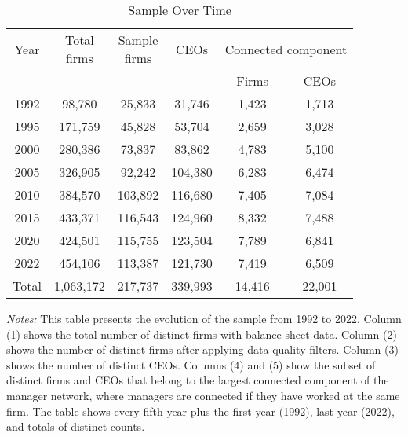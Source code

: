 \begin{table}[htbp]
\centering
\caption{Sample Over Time}
\label{tab:sample}
\begin{tabular}{*{6}{c}}
\toprule
Year & \shortstack{Total\\firms} & \shortstack{Sample\\firms} & CEOs & \multicolumn{2}{c}{Connected component} \\
\cmidrule(lr){5-6}
 & & & & Firms & CEOs \\
\midrule
1992 &       98,780 &       25,833 &       31,746 &        1,423 &        1,713 \\
1995 &      171,759 &       45,828 &       53,704 &        2,659 &        3,028 \\
2000 &      280,386 &       73,837 &       83,862 &        4,783 &        5,100 \\
2005 &      326,905 &       92,242 &      104,380 &        6,283 &        6,474 \\
2010 &      384,570 &      103,892 &      116,680 &        7,405 &        7,084 \\
2015 &      433,371 &      116,543 &      124,960 &        8,332 &        7,488 \\
2020 &      424,501 &      115,755 &      123,504 &        7,789 &        6,841 \\
2022 &      454,106 &      113,387 &      121,730 &        7,419 &        6,509 \\
\midrule
Total &    1,063,172 &      217,737 &      339,993 &       14,416 &       22,001 \\
\bottomrule
\end{tabular}
\begin{minipage}{12cm}
\footnotesize
\textit{Notes:} This table presents the evolution of the sample from 1992 to 2022. Column (1) shows the total number of distinct firms with balance sheet data. Column (2) shows the number of distinct firms after applying data quality filters. Column (3) shows the number of distinct CEOs. Columns (4) and (5) show the subset of distinct firms and CEOs that belong to the largest connected component of the manager network, where managers are connected if they have worked at the same firm. The table shows every fifth year plus the first year (1992), last year (2022), and totals of distinct counts. \end{minipage}
\end{table}
